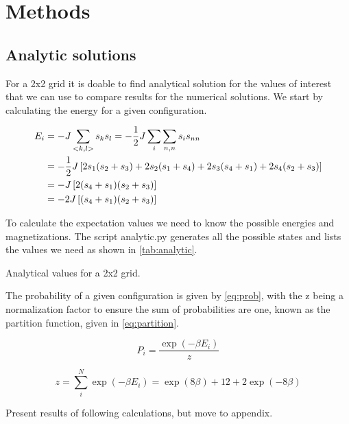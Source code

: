 \section{Methods}


\subsection{Analytic solutions}

For a 2x2 grid it is doable to find analytical solution for the values of
interest that we can use to compare results for the numerical solutions.
We start by calculating the energy for a given configuration.

\begin{align*}
  E_i &= -J \sum_{<k,l>} s_k s_l = -\frac{1}{2}J \sum_{i} \sum_{n,n} s_i s_{nn} \\
      &= -\frac{1}{2} J \left[2 s_1 (s_2 + s_3) + 2s_2(s_1 + s_4) + 2s_3(s_4 + s_1) + 2s_4 (s_2 + s_3)\right]\\
      &= -J\left[ 2(s_4 + s_1)(s_2 + s_3)\right] \\
      &= -2J\left[(s_4 + s_1)(s_2+s_3)\right]
\end{align*}

To calculate the expectation values we need to know the possible energies and
magnetizations. The script analytic.py \parencite{github} generates all the
possible states and lists the values we need as shown in \cref{tab:analytic}.

\begin{table}[htp]
  \centering
  \caption{Analytical values for a 2x2 grid.}
  \label{tab:analytic}
\end{table}

The probability of a given configuration is given by \cref{eq:prob}, with
the z being a normalization factor to ensure the sum of probabilities are one,
known as the partition function, given in \cref{eq:partition}.


\begin{equation}
  P_i = \frac{\exp(-\beta E_i)}{z}
  \label{eq:prob}
\end{equation}

\begin{equation}
  \label{eq:partition}
  z = \sum_{i}^{N} \exp(-\beta E_i) = \exp(8\beta) + 12 + 2\exp(-8\beta)
\end{equation}





Present results of following calculations, but move to appendix.



